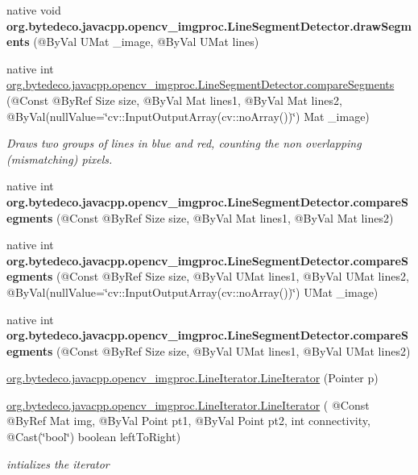 \begin{DoxyCompactItemize}
native void {\bfseries org.\+bytedeco.\+javacpp.\+opencv\+\_\+imgproc.\+Line\+Segment\+Detector.\+draw\+Segments} (@By\+Val U\+Mat \+\_\+image, @By\+Val U\+Mat lines)
\item 
native int \hyperlink{group__imgproc_ga5d2746803c6bf8d765754a7523f8f09b}{org.\+bytedeco.\+javacpp.\+opencv\+\_\+imgproc.\+Line\+Segment\+Detector.\+compare\+Segments} (@Const @By\+Ref Size size, @By\+Val Mat lines1, @By\+Val Mat lines2, @By\+Val(null\+Value=\char`\"{}cv\+::\+Input\+Output\+Array(cv\+::no\+Array())\char`\"{}) Mat \+\_\+image)
\begin{DoxyCompactList}\small\item\em Draws two groups of lines in blue and red, counting the non overlapping (mismatching) pixels. \end{DoxyCompactList}\item 
\mbox{\label{group__imgproc_ga38a2e400c1b043016accdedf1483b6d5}} 
native int {\bfseries org.\+bytedeco.\+javacpp.\+opencv\+\_\+imgproc.\+Line\+Segment\+Detector.\+compare\+Segments} (@Const @By\+Ref Size size, @By\+Val Mat lines1, @By\+Val Mat lines2)
\item 
\mbox{\label{group__imgproc_ga02458163e899048a4811bdf4723537f9}} 
native int {\bfseries org.\+bytedeco.\+javacpp.\+opencv\+\_\+imgproc.\+Line\+Segment\+Detector.\+compare\+Segments} (@Const @By\+Ref Size size, @By\+Val U\+Mat lines1, @By\+Val U\+Mat lines2, @By\+Val(null\+Value=\char`\"{}cv\+::\+Input\+Output\+Array(cv\+::no\+Array())\char`\"{}) U\+Mat \+\_\+image)
\item 
\mbox{\label{group__imgproc_gabeef7c1e98a7268dc25e18f5a0959104}} 
native int {\bfseries org.\+bytedeco.\+javacpp.\+opencv\+\_\+imgproc.\+Line\+Segment\+Detector.\+compare\+Segments} (@Const @By\+Ref Size size, @By\+Val U\+Mat lines1, @By\+Val U\+Mat lines2)
\item 
\hyperlink{group__imgproc_gab596cb042f00fd0833e914b7ea024342}{org.\+bytedeco.\+javacpp.\+opencv\+\_\+imgproc.\+Line\+Iterator.\+Line\+Iterator} (Pointer p)
\item 
\hyperlink{group__imgproc_ga56929bab5a89ba1c9bc2e00073eaedb4}{org.\+bytedeco.\+javacpp.\+opencv\+\_\+imgproc.\+Line\+Iterator.\+Line\+Iterator} ( @Const @By\+Ref Mat img, @By\+Val Point pt1, @By\+Val Point pt2, int connectivity, @Cast(\char`\"{}bool\char`\"{}) boolean left\+To\+Right)
\begin{DoxyCompactList}\small\item\em intializes the iterator \end{DoxyCompactList}\item 

\end{DoxyCompactItemize}
